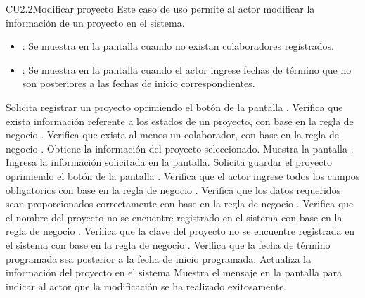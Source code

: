\begin{UseCase}{CU2.2}{Modificar proyecto}{
		Este caso de uso permite al actor modificar la información de un proyecto en el sistema.
	}
{\begin{itemize}
		\item {}: Se muestra en la pantalla  cuando no existan colaboradores registrados.
		\item {}: Se muestra en la pantalla  cuando el actor ingrese fechas de término que no son posteriores a las fechas
		de inicio correspondientes.
		\end{itemize}
		}
	\end{UseCase}
	\begin{UCtrayectoria}
		\UCpaso[\UCactor] Solicita registrar un proyecto oprimiendo el botón \editar de la pantalla .
		\UCpaso[\UCsist] Verifica que exista información referente a los estados de un proyecto, con base en la regla de negocio . 
		\UCpaso[\UCsist] Verifica que exista al menos un colaborador, con base en la regla de negocio . 
		\UCpaso[\UCsist] Obtiene la información del proyecto seleccionado.
		\UCpaso[\UCsist] Muestra la pantalla .
		\UCpaso[\UCactor] Ingresa la información solicitada en la pantalla. \label{CU2.2-P5}
		\UCpaso[\UCactor] Solicita guardar el proyecto oprimiendo el botón  de la pantalla . 
		\UCpaso[\UCsist] Verifica que el actor ingrese todos los campos obligatorios con base en la regla de negocio . 
		\UCpaso[\UCsist] Verifica que los datos requeridos sean proporcionados correctamente con base en la regla de negocio .  
		\UCpaso[\UCsist] Verifica que el nombre del proyecto no se encuentre registrado en el sistema con base en la regla de negocio . 
		\UCpaso[\UCsist] Verifica que la clave del proyecto no se encuentre registrada en el sistema con base en la regla de negocio . 
		\UCpaso[\UCsist] Verifica que la fecha de término programada sea posterior a la fecha de inicio programada. 
		\UCpaso[\UCsist] Actualiza la información del proyecto en el sistema
		\UCpaso[\UCsist] Muestra el mensaje  en la pantalla  para indicar al actor que la modificación se ha realizado exitosamente.
	\end{UCtrayectoria}		
